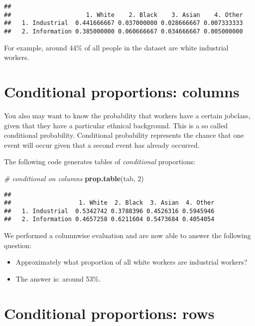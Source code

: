 \documentclass[
]{book}
\newenvironment{Shaded}{\begin{snugshade}}{\end{snugshade}}
\newcommand{\CommentTok}[1]{\textcolor[rgb]{0.56,0.35,0.01}{\textit{#1}}}
\newcommand{\DecValTok}[1]{\textcolor[rgb]{0.00,0.00,0.81}{#1}}
\newcommand{\KeywordTok}[1]{\textcolor[rgb]{0.13,0.29,0.53}{\textbf{#1}}}
\newcommand{\NormalTok}[1]{#1}
\providecommand{\tightlist}{%
  \setlength{\itemsep}{0pt}\setlength{\parskip}{0pt}}
\begin{document}
\begin{verbatim}
##                 
##                     1. White    2. Black    3. Asian    4. Other
##   1. Industrial  0.441666667 0.037000000 0.028666667 0.007333333
##   2. Information 0.385000000 0.060666667 0.034666667 0.005000000
\end{verbatim}

For example, around 44\% of all people in the dataset are white industrial workers.

\hypertarget{conditional-proportions-columns}{%
\section{Conditional proportions: columns}\label{conditional-proportions-columns}}

You also may want to know the probability that workers have a certain jobclass, given that they have a particular ethnical background. This is a so called conditional probability. Conditional probability represents the chance that one event will occur given that a second event has already occurred.

The following code generates tables of \emph{conditional} proportions:

\begin{Shaded}
\begin{Highlighting}[]
\CommentTok{\# conditional on columns}
\KeywordTok{prop.table}\NormalTok{(tab, }\DecValTok{2}\NormalTok{)  }
\end{Highlighting}
\end{Shaded}

\begin{verbatim}
##                 
##                   1. White  2. Black  3. Asian  4. Other
##   1. Industrial  0.5342742 0.3788396 0.4526316 0.5945946
##   2. Information 0.4657258 0.6211604 0.5473684 0.4054054
\end{verbatim}

We performed a columnwise evaluation and are now able to answer the following question:

\begin{itemize}
\tightlist
\item
  Approximately what proportion of all white workers are industrial workers?
\item
  The answer is: around 53\%.
\end{itemize}

\hypertarget{conditional-proportions-rows}{%
\section{Conditional proportions: rows}\label{conditional-proportions-rows}}
\end{document}
